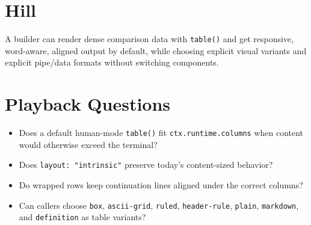 \section{Hill}\label{record-133-hill}

A builder can render dense comparison data with \texttt{t\allowbreak{}a\allowbreak{}b\allowbreak{}l\allowbreak{}e\allowbreak{}(\allowbreak{})} and get responsive, word-aware, aligned output by default, while choosing explicit visual variants and explicit pipe/data formats without switching components.

\section{Playback Questions}\label{record-133-playback-questions}

\begin{itemize}
\tightlist
\item
  Does a default human-mode \texttt{t\allowbreak{}a\allowbreak{}b\allowbreak{}l\allowbreak{}e\allowbreak{}(\allowbreak{})} fit \texttt{c\allowbreak{}t\allowbreak{}x\allowbreak{}.\allowbreak{}r\allowbreak{}u\allowbreak{}n\allowbreak{}t\allowbreak{}i\allowbreak{}m\allowbreak{}e\allowbreak{}.\allowbreak{}c\allowbreak{}o\allowbreak{}l\allowbreak{}u\allowbreak{}m\allowbreak{}n\allowbreak{}s} when content would otherwise exceed the terminal?
\item
  Does \texttt{l\allowbreak{}a\allowbreak{}y\allowbreak{}o\allowbreak{}u\allowbreak{}t\allowbreak{}:\allowbreak{} \allowbreak{}"\allowbreak{}i\allowbreak{}n\allowbreak{}t\allowbreak{}r\allowbreak{}i\allowbreak{}n\allowbreak{}s\allowbreak{}i\allowbreak{}c\allowbreak{}"} preserve today's content-sized behavior?
\item
  Do wrapped rows keep continuation lines aligned under the correct columns?
\item
  Can callers choose \texttt{b\allowbreak{}o\allowbreak{}x}, \texttt{a\allowbreak{}s\allowbreak{}c\allowbreak{}i\allowbreak{}i\allowbreak{}-\allowbreak{}g\allowbreak{}r\allowbreak{}i\allowbreak{}d}, \texttt{r\allowbreak{}u\allowbreak{}l\allowbreak{}e\allowbreak{}d}, \texttt{h\allowbreak{}e\allowbreak{}a\allowbreak{}d\allowbreak{}e\allowbreak{}r\allowbreak{}-\allowbreak{}r\allowbreak{}u\allowbreak{}l\allowbreak{}e}, \texttt{p\allowbreak{}l\allowbreak{}a\allowbreak{}i\allowbreak{}n}, \texttt{m\allowbreak{}a\allowbreak{}r\allowbreak{}k\allowbreak{}d\allowbreak{}o\allowbreak{}w\allowbreak{}n}, and \texttt{d\allowbreak{}e\allowbreak{}f\allowbreak{}i\allowbreak{}n\allowbreak{}i\allowbreak{}t\allowbreak{}i\allowbreak{}o\allowbreak{}n} as table variants?

\end{itemize}
